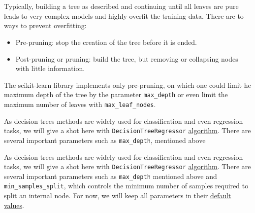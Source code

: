 \documentclass[11pt]{article}
\providecommand{\tightlist}{%
      \setlength{\itemsep}{0pt}\setlength{\parskip}{0pt}}
\begin{document}
{    \begin{center}
    \end{center}
    { \hspace*{\fill} \\}
    
    \begin{center}
    \end{center}
    { \hspace*{\fill} \\}
    
    Typically, building a tree as described and continuing until all leaves
are pure leads to very complex models and highly overfit the training
data. There are to ways to prevent overfitting:

\begin{itemize}
\tightlist
\item
  Pre-pruning: stop the creation of the tree before it is ended.
\item
  Post-pruning or pruning: build the tree, but removing or collapsing
  nodes with little information.
\end{itemize}

The scikit-learn library implements only pre-pruning, on which one could
limit he maximum depth of the tree by the parameter \texttt{max\_depth}
or even limit the maximum number of leaves with
\texttt{max\_leaf\_nodes}.

As decision trees methods are widely used for classification and even
regression tasks, we will give a shot here with
\texttt{DecisionTreeRegressor}
\href{http://scikit-learn.org/stable/modules/generated/sklearn.tree.DecisionTreeRegressor.html}{algorithm}.
There are several important parameters such as \texttt{max\_depth},
mentioned above

As decision trees methods are widely used for classification and even
regression tasks, we will give a shot here with
\texttt{DecisionTreeRegressor}
\href{http://scikit-learn.org/stable/modules/generated/sklearn.tree.DecisionTreeRegressor.html}{algorithm}.
There are several important parameters such as \texttt{max\_depth}
mentioned above and \texttt{min\_samples\_split}, which controls the
minimum number of samples required to split an internal node. For now,
we will keep all parameters in their
\href{http://scikit-learn.org/stable/modules/generated/sklearn.tree.DecisionTreeRegressor.html}{default
values}.

}
\end{document}
